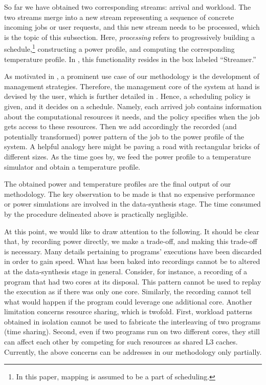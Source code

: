 So far we have obtained two corresponding streams: arrival and workload. The two
streams merge into a new stream representing a sequence of concrete incoming
jobs or user requests, and this new stream needs to be processed, which is the
topic of this subsection. Here, \emph{processing} refers to progressively
building a schedule,\footnote{In this paper, mapping is assumed to be a part of
scheduling.} constructing a power profile, and computing the corresponding
temperature profile. In , this functionality resides in the
box labeled ``Streamer.''

As motivated in , a prominent use case of our methodology is
the development of management strategies. Therefore, the management core of the
system at hand is devised by the user, which is further detailed in
. Hence, a scheduling policy is given, and it decides on a schedule.
Namely, each arrived job contains information about the computational resources
it needs, and the policy specifies when the job gets access to these resources.
Then we add accordingly the recorded (and potentially transformed) power pattern
of the job to the power profile of the system. A helpful analogy here might be
paving a road with rectangular bricks of different sizes. As the time goes by,
we feed the power profile to a temperature simulator and obtain a temperature
profile.

The obtained power and temperature profiles are the final output of our
methodology. The key observation to be made is that no expensive performance or
power simulations are involved in the data-synthesis stage. The time consumed by
the procedure delineated above is practically negligible.

At this point, we would like to draw attention to the following. It should be
clear that, by recording power directly, we make a trade-off, and making this
trade-off is necessary. Many details pertaining to programs' executions have
been discarded in order to gain speed. What has been baked into recordings
cannot be to altered at the data-synthesis stage in general. Consider, for
instance, a recording of a program that had two cores at its disposal. This
pattern cannot be used to replay the execution as if there was only one core.
Similarly, the recording cannot tell what would happen if the program could
leverage one additional core. Another limitation concerns resource sharing,
which is twofold. First, workload patterns obtained in isolation cannot be used
to fabricate the interleaving of two programs (time sharing). Second, even if
two programs run on two different cores, they still can affect each other by
competing for such resources as shared L3 caches. Currently, the above concerns
can be addresses in our methodology only partially.
